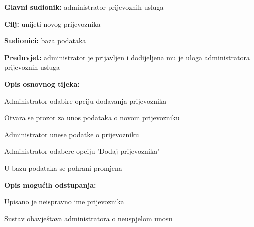                         \noindent {}
					\begin{packed_item}
	
						\item \textbf{Glavni sudionik: }administrator prijevoznih usluga
						\item  \textbf{Cilj:} unijeti novog prijevoznika
						\item  \textbf{Sudionici:} baza podataka
						\item  \textbf{Preduvjet:} administrator je prijavljen i dodijeljena mu je uloga administratora prijevoznih usluga
						\item  \textbf{Opis osnovnog tijeka:}
						
						\item[] \begin{packed_enum}
	
							\item Administrator odabire opciju dodavanja prijevoznika
                                \item Otvara se prozor za unos podataka o novom prijevozniku
                                \item Administrator unese podatke o prijevozniku
                                \item Administrator odabere opciju 'Dodaj prijevoznika'
                                \item U bazu podataka se pohrani promjena
						\end{packed_enum}
						
						\item  \textbf{Opis mogućih odstupanja:}
						
						\item[] \begin{packed_item}
	
							\item[3.a] Upisano je neispravno ime prijevoznika
							\item[] \begin{packed_enum}
								
								\item Sustav obavještava administratora o neuspjelom unosu
								
							\end{packed_enum}
							
						\end{packed_item}
					\end{packed_item}

